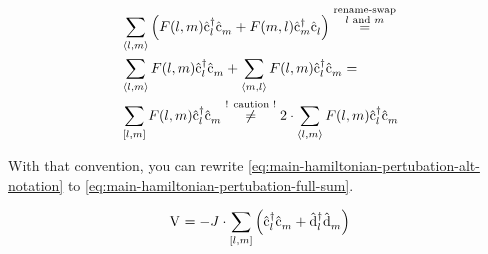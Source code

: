 \begin{equation}
    \label{eq:fullneigborsum}
    \begin{split}
        &\neighborsum[]{l}{m} \left( F(l,m) \cop[]{l}{\dagger}\cop[]{m}{} + F(m,l) \cop[]{m}{\dagger}\cop[]{l}{} \right) \stackrel{\stackrel{\text{\scriptsize rename-swap}}{\text{$l$ and $m$}}}{=} \\
        &\neighborsum[]{l}{m} F(l,m) \cop[]{l}{\dagger}\cop[]{m}{} + \neighborsum[]{m}{l} F(l,m) \cop[]{l}{\dagger}\cop[]{m}{} = \\
        &\fullneighborsum[]{l}{m} F(l,m) \cop[]{l}{\dagger}\cop[]{m}{} \stackrel{\text{! caution !}}{\neq}
        2 \cdot \neighborsum[]{l}{m} F(l,m) \cop[]{l}{\dagger}\cop[]{m}{}
    \end{split}
\end{equation}

With that convention, you can rewrite \autoref{eq:main-hamiltonian-pertubation-alt-notation} to \autoref{eq:main-hamiltonian-pertubation-full-sum}.

\begin{equation}
    \label{eq:main-hamiltonian-pertubation-full-sum}
    \begin{split}
        \Vhamiltonian =  - J \cdot \fullneighborsum{l}{m} \left(\cop[]{l}{\dagger}\cop[]{m}{} + \dop[]{l}{\dagger}\dop[]{m}{} \right)
    \end{split}
\end{equation}
